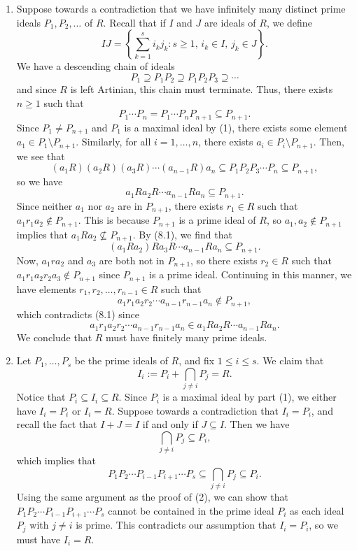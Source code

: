 \begin{pf}
\begin{enumerate}[(1)]
    \item Suppose towards a contradiction that we have infinitely many distinct prime ideals 
    $P_1, P_2, \dots$ of $R$. Recall that if $I$ and $J$ are ideals of $R$, we define 
    \[ IJ = \left\{\sum_{k=1}^s i_kj_k : s \geq 1,\, i_k \in I,\, j_k \in J\right\}. \]
    We have a descending chain of ideals 
    \[ P_1 \supseteq P_1P_2 \supseteq P_1P_2P_3 \supseteq \cdots \]
    and since $R$ is left Artinian, this chain must terminate. Thus, there exists $n \geq 1$ such that 
    \[ P_1 \cdots P_n = P_1 \cdots P_n P_{n+1} \subseteq P_{n+1}. \]
    Since $P_1 \neq P_{n+1}$ and $P_1$ is a maximal ideal by (1), there exists some element 
    $a_1 \in P_1 \setminus P_{n+1}$. Similarly, for all $i = 1, \dots, n$, there exists 
    $a_i \in P_i \setminus P_{n+1}$. Then, we see that 
    \[ (a_1R)(a_2R)(a_3R) \cdots (a_{n-1}R) a_n \subseteq P_1P_2P_3 \cdots P_n \subseteq P_{n+1}, \]
    so we have 
    \begin{equation}
        a_1Ra_2R \cdots a_{n-1}Ra_n \subseteq P_{n+1}.
    \end{equation} 
    Since neither $a_1$ nor $a_2$ are in $P_{n+1}$, there exists $r_1 \in R$ such that 
    $a_1r_1a_2 \notin P_{n+1}$. This is because $P_{n+1}$ is a prime ideal of $R$, so $a_1, a_2 \notin P_{n+1}$ 
    implies that $a_1 R a_2 \nsubseteq P_{n+1}$. By (8.1), we find that 
    \[ (a_1Ra_2)Ra_3R \cdots a_{n-1}Ra_n \subseteq P_{n+1}. \]
    Now, $a_1ra_2$ and $a_3$ are both not in $P_{n+1}$, so there exists $r_2 \in R$ such that 
    $a_1r_1a_2r_2a_3 \notin P_{n+1}$ since $P_{n+1}$ is a prime ideal. Continuing in this manner, 
    we have elements 
    $r_1, r_2, \dots, r_{n-1} \in R$ such that 
    \[ a_1r_1a_2r_2 \cdots a_{n-1}r_{n-1}a_n \notin P_{n+1}, \]
    which contradicts (8.1) since 
    \[ a_1r_1a_2r_2 \cdots a_{n-1}r_{n-1}a_n \in a_1Ra_2R \cdots a_{n-1}Ra_n. \]
    We conclude that $R$ must have finitely many prime ideals.
    
    \item Let $P_1, \dots, P_s$ be the prime ideals of $R$, and fix $1 \leq i \leq s$. We claim that 
    \[ I_i := P_i + \bigcap_{j\neq i} P_j = R. \]
    Notice that $P_i \subseteq I_i \subseteq R$. Since $P_i$ is a maximal ideal by part (1), we either
    have $I_i = P_i$ or $I_i = R$. Suppose towards a contradiction that $I_i = P_i$, and recall the fact
    that $I + J = I$ if and only if $J \subseteq I$. Then we have 
    \[ \bigcap_{j\neq i} P_j \subseteq P_i, \]
    which implies that 
    \[ P_1P_2 \cdots P_{i-1}P_{i+1} \cdots P_s \subseteq \bigcap_{j\neq i} P_j \subseteq P_i. \]
    Using the same argument as the proof of (2), we can show that $P_1P_2 \cdots P_{i-1}P_{i+1} 
    \cdots P_s$ cannot be contained in the prime ideal $P_i$ as each ideal $P_j$ with $j \neq i$ is 
    prime. This contradicts our assumption that $I_i = P_i$, so we must have 
    $I_i = R$. \qedhere 
\end{enumerate}
\end{pf}

